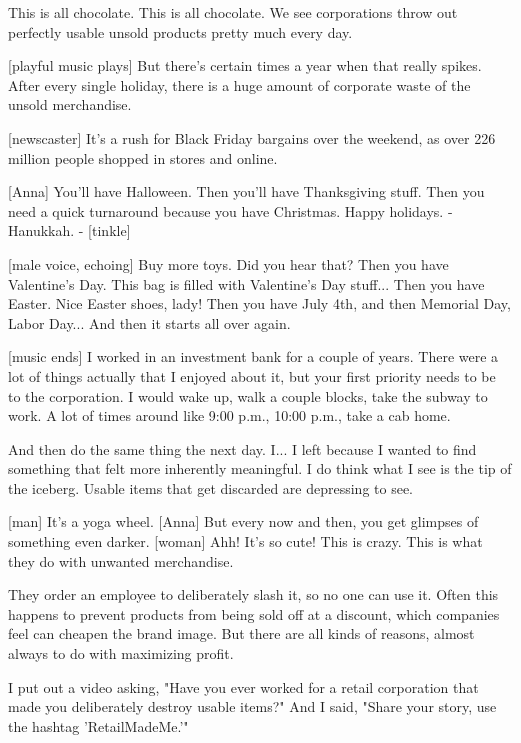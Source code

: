 \documentclass[a4paper]{article}
\begin{document}
	This is all chocolate.
	This is all chocolate.
	We see corporations throw out perfectly usable unsold products pretty much every day.
	
	
	[playful music plays]
	But there's certain times a year when that really spikes.
	After every single holiday, there is a huge amount of corporate waste of the unsold merchandise.
	
	
	[newscaster] It's a rush for Black Friday bargains over the weekend, as over 226 million people shopped in stores and online.
	
	
	[Anna] You'll have Halloween.
	Then you'll have Thanksgiving stuff.
	Then you need a quick turnaround because you have Christmas.
	Happy holidays.
	- Hanukkah. - [tinkle]
	
	
	
	[male voice, echoing] Buy more toys.
	Did you hear that?
	Then you have Valentine's Day.
	This bag is filled with Valentine's Day stuff...
	Then you have Easter.
	Nice Easter shoes, lady!
	Then you have July 4th, and then Memorial Day, Labor Day...
	And then it starts all over again.
	
	
	[music ends]
	I worked in an investment bank for a couple of years.
	There were a lot of things actually that I enjoyed about it, but your first priority needs to be to the corporation.
	I would wake up, walk a couple blocks, take the subway to work.
	A lot of times around like 9:00 p.m., 10:00 p.m., take a cab home.
	
	
	And then do the same thing the next day.
	I... I left because I wanted to find something that felt more inherently meaningful.
	I do think what I see is the tip of the iceberg.
	Usable items that get discarded are depressing to see.
	
	
	[man] It's a yoga wheel.
	[Anna] But every now and then, you get glimpses of something even darker.
	[woman] Ahh! It's so cute!
	This is crazy. This is what they do with unwanted merchandise.
	
	
	They order an employee to deliberately slash it, so no one can use it.
	Often this happens to prevent products from being sold off at a discount, which companies feel can cheapen the brand image.
	But there are all kinds of reasons, almost always to do with maximizing profit.
	
	
	I put out a video asking, "Have you ever worked for a retail corporation that made you deliberately destroy usable items?"
	And I said, "Share your story, use the hashtag 'RetailMadeMe.'"
	
	
	
\end{document}
